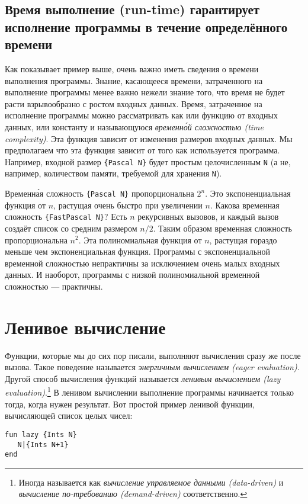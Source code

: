 \subsection{Время выполнение (run-time) гарантирует исполнение программы в течение определённого времени}

Как показывает пример выше, очень важно иметь сведения о времени выполнения программы. Знание, касающееся времени, затраченного на выполнение программы менее важно нежели знание того, что время не будет расти взрывообразно с ростом входных данных. Время, затраченное на исполнение программы можно рассматривать как или функцию от входных данных, или константу и называющуюся \emph{временн\'{о}й сложностью (time complexity)}. Эта функция зависит от изменения размеров входных данных. Мы предполагаем что эта функция зависит от того как используется программа. Например, входной размер \lstinline|{Pascal N}| будет простым целочисленным \lstinline|N| (а не, например, количеством памяти, требуемой для хранения \lstinline|N|).

Временн\'{а}я сложность \lstinline|{Pascal N}| пропорциональна $2^n$. Это экспоненциальная функция от $n$, растущая очень быстро при увеличении $n$. Какова временная сложность \lstinline|{FastPascal N}|? Есть $n$ рекурсивных вызовов, и каждый вызов создаёт список со средним размером $n/2$. Таким образом временная сложность пропорциональна $n^2$. Эта полиномиальная функция от $n$, растущая гораздо меньше чем экспоненциальная функция. Программы с экспоненциальной временной сложностью непрактичны за исключением очень малых входных данных. И наоборот, программы с низкой полиномиальной временной сложностью --- практичны.

\section{Ленивое вычисление}\label{section:lazy_evaluation}

Функции, которые мы до сих пор писали, выполняют вычисления сразу же после вызова. Такое поведение называется \emph{энергичным вычислением (eager evaluation)}. Другой способ вычисления функций называется \emph{ленивым вычислением (lazy evaluation)}.\footnote{Иногда называется как \emph{вычисление управляемое данными (data-driven)} и \emph{вычисление по-требованию (demand-driven)} соответственно.} В ленивом вычислении выполнение программы начинается только тогда, когда нужен результат. Вот простой пример ленивой функции, вычисляющей список целых чисел:

\begin{lstlisting}
fun lazy {Ints N}
   N|{Ints N+1}
end
\end{lstlisting}


